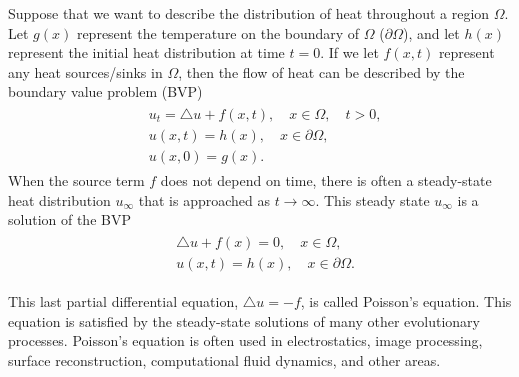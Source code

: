 \label{lab:finitedifference2}

Suppose that we want to describe the distribution of heat throughout a region $\Omega$. Let $g(x)$ represent the temperature on the boundary of $\Omega$ ($\partial \Omega$), and let $h(x)$ represent the initial heat distribution at time $t = 0$. If we let $f(x,t)$ represent any heat sources/sinks in $\Omega$, then the flow of heat can be described by the boundary value problem (BVP)
\begin{align}
	\begin{split}
		& { } u_t = \triangle u + f(x,t), \quad x \in \Omega, \quad t >0,\\
		& { }u(x,t) = h(x), \quad x \in \partial \Omega, \\
		& { }u(x,0) = g(x).
	\end{split}
\end{align}
When the source term $f$ does not depend on time, there is often a steady-state heat distribution $u_{\infty}$ that is approached as $t \to \infty$. This steady state $u_{\infty}$ is a solution of the BVP
\begin{align}
	\begin{split}
		& { }  \triangle u + f(x) = 0, \quad x \in \Omega,\\
		& { }u(x,t) = h(x), \quad x \in \partial \Omega.
	\end{split}
\end{align}

This last partial differential equation, $\triangle u = -f$, is called Poisson's equation. This equation is satisfied by the steady-state solutions of many other evolutionary processes. Poisson's equation is often used in electrostatics, image processing, surface reconstruction, computational fluid dynamics, and other areas. 

